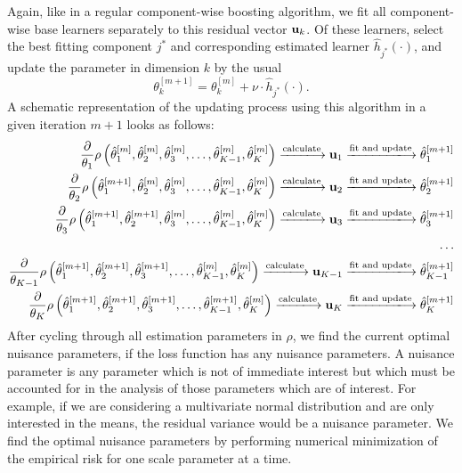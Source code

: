 Again, like in a regular component-wise boosting algorithm, we fit all component-wise base learners separately to this residual vector $\mathbf{u}_k$. Of these learners, select the best fitting component $j^*$ and corresponding estimated learner $\hat{h}_{j^*}(\cdot)$, and update the parameter in dimension $k$ by the usual
\begin{equation}
    \theta_k^{[m+1]}=\theta_k^{[m]}+\nu\cdot \hat{h}_{j^*}(\cdot).
\end{equation}
A schematic representation of the updating process using this algorithm in a given iteration $m+1$ looks as follows:
\begin{align*}
    \frac{\partial}{\theta_1}\rho\left(\hat{\theta}_1^{[m]},\hat{\theta}_2^{[m]},\hat{\theta}_3^{[m]},\ldots,\hat{\theta}_{K-1}^{[m]},\hat{\theta}_K^{[m]}\right)
    \xlongrightarrow{\text{calculate}}\u_{1}
    \xlongrightarrow{\text{fit and update}}\hat{\theta}_{1}^{[m+1]} \\
    \frac{\partial}{\theta_2}\rho\left(\hat{\theta}_1^{[m+1]},\hat{\theta}_2^{[m]},\hat{\theta}_3^{[m]},\ldots,\hat{\theta}_{K-1}^{[m]},\hat{\theta}_K^{[m]}\right)
    \xlongrightarrow{\text{calculate}} \u_{2}
    \xlongrightarrow{\text{fit and update}}\hat{\theta}_{2}^{[m+1]} \\
    \frac{\partial}{\theta_3}\rho\left(\hat{\theta}_1^{[m+1]},\hat{\theta}_2^{[m+1]},\hat{\theta}_3^{[m]},\ldots,\hat{\theta}_{K-1}^{[m]},\hat{\theta}_K^{[m]}\right)
    \xlongrightarrow{\text{calculate}}\u_{3}
    \xlongrightarrow{\text{fit and update}}\hat{\theta}_{3}^{[m+1]} \\
    \ldots\\
    \frac{\partial}{\theta_{K-1}}\rho\left(\hat{\theta}_1^{[m+1]},\hat{\theta}_2^{[m+1]},\hat{\theta}_3^{[m+1]},\ldots,\hat{\theta}_{K-1}^{[m]},\hat{\theta}_K^{[m]}\right)
    \xlongrightarrow{\text{calculate}}\u_{K-1}
    \xlongrightarrow{\text{fit and update}}\hat{\theta}_{K-1}^{[m+1]} \\
    \frac{\partial}{\theta_K}\rho\left(\hat{\theta}_1^{[m+1]},\hat{\theta}_2^{[m+1]},\hat{\theta}_3^{[m+1]},\ldots,\hat{\theta}_{K-1}^{[m+1]},\hat{\theta}_K^{[m]}\right)
    \xlongrightarrow{\text{calculate}}\u_{K}
    \xlongrightarrow{\text{fit and update}}\hat{\theta}_{K}^{[m+1]}
\end{align*}
After cycling through all estimation parameters in $\rho$, we find the current optimal nuisance parameters, if the loss function has any nuisance parameters. A nuisance parameter is any parameter which is not of immediate interest but which must be accounted for in the analysis of those parameters which are of interest. For example, if we are considering a multivariate normal distribution and are only interested in the means, the residual variance would be a nuisance parameter. We find the optimal nuisance parameters by performing numerical minimization of the empirical risk for one scale parameter at a time.
